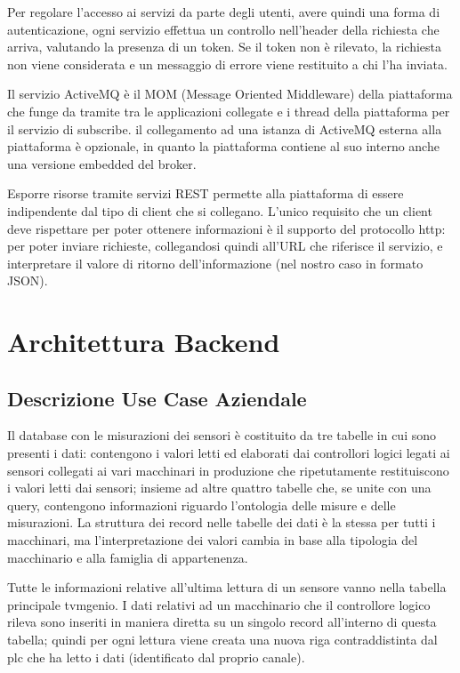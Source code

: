 Per regolare l’accesso ai servizi da parte degli utenti, avere quindi una forma di autenticazione, ogni servizio effettua un controllo nell'header della richiesta che arriva, valutando la presenza di un token. Se il token non è rilevato, la richiesta non viene considerata e un messaggio di errore viene restituito a chi l’ha inviata. \par
Il servizio ActiveMQ è il MOM (Message Oriented Middleware) della piattaforma che funge da tramite tra le applicazioni collegate e i thread della piattaforma per il servizio di subscribe. il collegamento ad una istanza di ActiveMQ esterna alla piattaforma è opzionale, in quanto la piattaforma contiene al suo interno anche una versione embedded del broker. 
\par
Esporre risorse tramite servizi REST permette alla piattaforma di essere indipendente dal tipo di client che si collegano. L’unico requisito che un client deve rispettare per poter ottenere informazioni è il supporto del protocollo http: per poter inviare richieste, collegandosi quindi all’URL che riferisce il servizio, e interpretare il valore di ritorno dell’informazione (nel nostro caso in formato JSON).
\clearpage
\section{Architettura Backend}
\subsection{Descrizione Use Case Aziendale}
Il database con le misurazioni dei sensori è costituito da tre tabelle in cui sono presenti i dati: contengono i valori letti ed elaborati dai controllori logici legati ai sensori collegati ai vari macchinari in produzione che ripetutamente restituiscono i valori letti dai sensori; insieme ad altre quattro tabelle che, se unite con una query, contengono informazioni riguardo l’ontologia delle misure e delle misurazioni. La struttura dei record nelle tabelle dei dati è la stessa per tutti i macchinari, ma l’interpretazione dei valori cambia in base alla tipologia del macchinario e alla famiglia di appartenenza.

Tutte le informazioni relative all’ultima lettura di un sensore vanno nella tabella principale tvmgenio. I dati relativi ad un macchinario che il controllore logico rileva sono inseriti in maniera diretta su un singolo record all’interno di questa tabella; quindi per ogni lettura viene creata una nuova riga contraddistinta dal plc che ha letto i dati (identificato dal proprio canale). 

